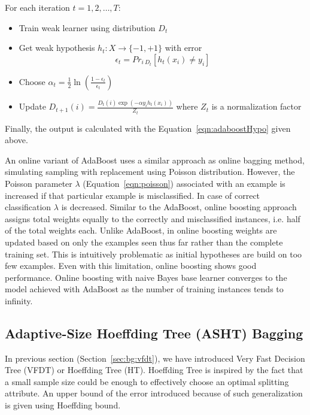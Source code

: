 For each iteration $t= 1, 2, \dots, T$:
\begin{itemize}
    \item Train weak learner using distribution $D_t$
    \item Get weak hypothesis $h_t : X \rightarrow \{-1, +1\}$ with error
    \[
        \epsilon_t = Pr_{i ~ D_t} [h_t(x_i) \ne y_i]
    \]
    \item Choose $\alpha_t = \frac{1}{2} \ln \left( \frac{1 - \epsilon_t}{\epsilon_t} \right)$
    \item Update $D_{t+1} (i) = \frac{D_t(i) \exp(-\alpha y_i h_t(x_i))}{Z_t}$ where $Z_t$ is a normalization factor
\end{itemize}
Finally, the output is calculated with the Equation~\ref{eqn:adaboostHypo} given above.

An online variant of AdaBoost uses a similar approach as online bagging method, simulating sampling with replacement using Poisson distribution. However, the Poisson parameter $\lambda$ (Equation~\ref{eqn:poisson}) associated with an example is increased if that particular example is misclassified. In case of correct classification $\lambda$ is decreased. Similar to the AdaBoost, online boosting approach assigns total weights equally to the correctly and misclassified instances, i.e. half of the total weights each. Unlike AdaBoost, in online boosting weights are updated based on only the examples seen thus far rather than the complete training set. This is intuitively problematic as initial hypotheses are build on too few examples. Even with this limitation, online boosting shows good performance. Online boosting with naive Bayes base learner converges to the model achieved with AdaBoost as the number of training instances tends to infinity.

\subsection{Adaptive-Size Hoeffding Tree (ASHT) Bagging}
In previous section (Section~\ref{sec:bg:vfdt}), we have introduced Very Fast Decision Tree (VFDT) or Hoeffding Tree (HT). Hoeffding Tree is inspired by the fact that a small sample size could be enough to effectively choose an optimal splitting attribute. An upper bound of the error introduced because of such generalization is given using Hoeffding bound.

